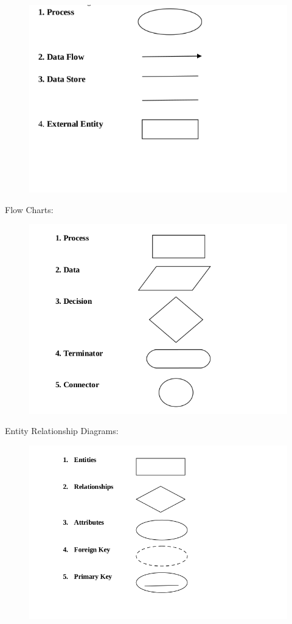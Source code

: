 \begin{figure}[h]
\centering \includegraphics[scale=0.6]{sss1.png}
\end{figure}
Flow Charts:
\begin{figure}[h]
\centering \includegraphics[scale=0.5]{sss2.png}
\end{figure}
\newpage
Entity Relationship Diagrams:\\
\begin{figure}[h]
\centering \includegraphics[scale=0.6]{sss3.png}
\end{figure}\\
